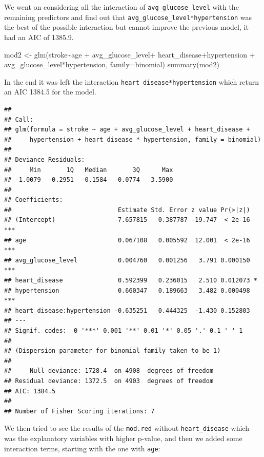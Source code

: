 \documentclass[
]{article}
\newenvironment{Shaded}{\begin{snugshade}}{\end{snugshade}}
\newcommand{\AttributeTok}[1]{\textcolor[rgb]{0.77,0.63,0.00}{#1}}
\newcommand{\FunctionTok}[1]{\textcolor[rgb]{0.00,0.00,0.00}{#1}}
\newcommand{\NormalTok}[1]{#1}
\newcommand{\OtherTok}[1]{\textcolor[rgb]{0.56,0.35,0.01}{#1}}
\newcommand{\SpecialCharTok}[1]{\textcolor[rgb]{0.00,0.00,0.00}{#1}}
\begin{document}
We went on considering all the interaction of
\texttt{avg\_glucose\_level} with the remaining predictors and find out
that \texttt{avg\_glucose\_level*hypertension} was the best of the
possible interaction but cannot improve the previous model, it had an
AIC of 1385.9.

\begin{Shaded}
\begin{Highlighting}[]
\NormalTok{mod2 }\OtherTok{\textless{}{-}} \FunctionTok{glm}\NormalTok{(stroke}\SpecialCharTok{\textasciitilde{}}\NormalTok{age }\SpecialCharTok{+}\NormalTok{ avg\_glucose\_level}\SpecialCharTok{+}\NormalTok{ heart\_disease}\SpecialCharTok{+}\NormalTok{hypertension }\SpecialCharTok{+}
\NormalTok{              avg\_glucose\_level}\SpecialCharTok{*}\NormalTok{hypertension, }\AttributeTok{family=}\NormalTok{binomial)}
\FunctionTok{summary}\NormalTok{(mod2)}
\end{Highlighting}
\end{Shaded}

In the end it was left the interaction
\texttt{heart\_disease*hypertension} which return an AIC 1384.5 for the
model.

\begin{verbatim}
## 
## Call:
## glm(formula = stroke ~ age + avg_glucose_level + heart_disease + 
##     hypertension + heart_disease * hypertension, family = binomial)
## 
## Deviance Residuals: 
##     Min       1Q   Median       3Q      Max  
## -1.0079  -0.2951  -0.1584  -0.0774   3.5900  
## 
## Coefficients:
##                             Estimate Std. Error z value Pr(>|z|)    
## (Intercept)                -7.657815   0.387787 -19.747  < 2e-16 ***
## age                         0.067108   0.005592  12.001  < 2e-16 ***
## avg_glucose_level           0.004760   0.001256   3.791 0.000150 ***
## heart_disease               0.592399   0.236015   2.510 0.012073 *  
## hypertension                0.660347   0.189663   3.482 0.000498 ***
## heart_disease:hypertension -0.635251   0.444325  -1.430 0.152803    
## ---
## Signif. codes:  0 '***' 0.001 '**' 0.01 '*' 0.05 '.' 0.1 ' ' 1
## 
## (Dispersion parameter for binomial family taken to be 1)
## 
##     Null deviance: 1728.4  on 4908  degrees of freedom
## Residual deviance: 1372.5  on 4903  degrees of freedom
## AIC: 1384.5
## 
## Number of Fisher Scoring iterations: 7
\end{verbatim}

We then tried to see the results of the \texttt{mod.red} without
\texttt{heart\_disease} which was the explanatory variables with higher
p-value, and then we added some interaction terms, starting with the one
with \texttt{age}:
\end{document}

